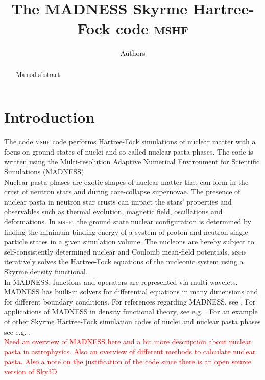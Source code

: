 \documentclass[4p]{elsarticle}
\begin{document}
\begin{frontmatter}

\title{The \textsc{MADNESS} Skyrme Hartree-Fock code \textsc{mshf}}

\author{Authors}
\address{Affiliations}

\begin{abstract}
Manual abstract
\end{abstract}


\end{frontmatter}

\linenumbers

\section{Introduction}
The code \textsc{mshf} code performs Hartree-Fock simulations of nuclear matter with a focus on ground states of nuclei and so-called nuclear pasta phases. The code is written using the Multi-resolution Adaptive Numerical Environment for Scientific Simulations (\textsc{MADNESS}).\\
Nuclear pasta phases are exotic shapes of nuclear matter that can form in the crust of neutron stars and during core-collapse supernovae. The presence of nuclear pasta in neutron star crusts can impact the stars' properties and observables such as thermal evolution, magnetic field, oscillations and deformations. In \textsc{mshf}, the ground state nuclear configuration is determined by finding the minimum binding energy of a system of proton and neutron single particle states in a given simulation volume. The nucleons are hereby subject to self-consistently determined nuclear and Coulomb mean-field potentials. \textsc{mshf} iteratively solves the Hartree-Fock equations of the nucleonic system using a Skyrme density functional. \\
In MADNESS, functions and operators are represented via multi-wavelets. MADNESS has built-in solvers for differential equations in many dimensions and for different boundary conditions. For references regarding MADNESS, see \cite{Harrison15, Harrison05, Harrison04, Fann10, Fann09}. For applications of MADNESS in density functional theory, see e.g. \cite{Pei12, Pei14}. For an example of other Skyrme Hartree-Fock simulation codes of nuclei and nuclear pasta phases see e.g. \cite{Maruhn14}.  \\
\textcolor{red}{Need an overview of MADNESS here and a bit more description about nuclear pasta in astrophysics. Also an overview of different methods to calculate nuclear pasta. Also a note on the justification of the code since there is an open source version of Sky3D}
\end{document}
